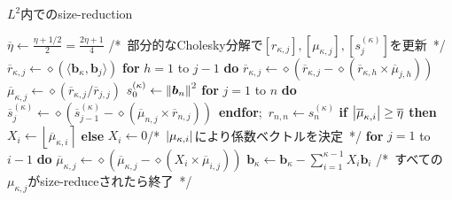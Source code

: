 \documentclass[12pt,aspectratio=169,table,dvipdfmx, leqno]{beamer}
\renewcommand{\Comment}[1]{\quad/*~#1~*/}
\newcommand{\round}[1]{\left\lfloor #1 \right\rceil}
\begin{document}
\begin{frame}{}
\begin{algorithm}[H]
    \footnotesize
    \begin{algorithmic}[1]
        \caption{\footnotesize $L^2$内でのsize-reduction\cite{NS05}}
        \label{alg_size_L2}
        \State $\overline{\eta}\gets\frac{\eta+1/2}{2}=\frac{2\eta+1}{4}$
        \Do
            \Comment{部分的なCholesky分解で$[r_{\kappa, j}], [\mu_{\kappa, j}], [s_{j}^{(\kappa)}]$を更新}
                \State $\overline{r}_{\kappa, j}\gets \diamond(\langle\bm{b}_\kappa, \bm{b}_j\rangle)$
                \State \textbf{for} $h=1$ to $j-1$ \textbf{do} $\overline{r}_{\kappa, j}\gets \diamond(\overline{r}_{\kappa, j}-\diamond(\overline{r}_{\kappa, h}\times\overline{\mu}_{j, h}))$
                \State $\overline{\mu}_{\kappa, j}\gets \diamond(\overline{r}_{\kappa, j}/\overline{r}_{j, j})$
            \EndFor
            \State $s_0^{(\kappa)}\gets \norm{\bm{b}_n}^2$
            \State \textbf{for} $j = 1$ to $n$ \textbf{do} $\overline{s}_j^{(\kappa)}\gets \diamond(\overline{s}_{j-1}^{(\kappa)}-\diamond(\overline{\mu}_{n, j}\times\overline{r}_{n, j}))$~\textbf{endfor};~$r_{n, n}\gets s_n^{(\kappa)}$
                \State \textbf{if} $\abs{\overline{\mu}_{\kappa, i}}\ge \overline{\eta}$ \textbf{then} $X_i\gets \round{\overline{\mu}_{\kappa, i}}$ \textbf{else} $X_i\gets 0$\Comment{$\abs{\mu_{\kappa, i}}$により係数ベクトルを決定}
                \State \textbf{for} $j=1$ to $i-1$ \textbf{do} $\overline{\mu}_{\kappa, j}\gets \diamond(\overline{\mu}_{\kappa, j}-\diamond(X_i\times\overline{\mu}_{i, j}))$
            \EndFor
            \State $\bm{b}_\kappa\gets \bm{b}_\kappa-\sum_{i=1}^{\kappa-1}X_i\bm{b}_i$
        \Comment{すべての$\mu_{\kappa, j}$がsize-reduceされたら終了}
    \end{algorithmic}
\end{algorithm}
\end{frame}
\end{document}
